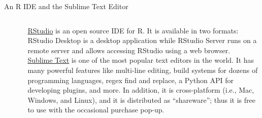 \documentclass[pdf]{beamer}
\theoremstyle{remark}
\theoremstyle{definition}
\begin{document}
\begin{frame}[t]{An R IDE and the Sublime Text Editor}
\begin{columns}[T]
\begin{column}{0.2\textwidth}
\begin{figure}[htbp]
  \captionsetup{justification=centering}
  \includegraphics[height=1.2cm, trim=0.1cm 0.1cm 0.1cm 0.1cm width=1.2cm]{Images/R.jpg}
\end{figure}
\vspace{8.0ex}
\begin{figure}[htbp]
  \captionsetup{justification=centering}
  \includegraphics[height=1.2cm, trim=0.1cm 0.1cm 0.1cm 0.1cm width=1.2cm]{Images/Sublime_Text.jpg}
\end{figure}
\end{column}
\begin{column}{0.7\textwidth}  %
\href{https://posit.co/download/rstudio-desktop/}{RStudio} is an open source IDE for R. It is available in two formats: RStudio Desktop is a desktop application while RStudio Server runs on a remote server and allows accessing RStudio using a web browser. \\
\vspace{1.5ex}
\href{https://www.sublimetext.com/}{Sublime Text} is one of the most popular text editors in the world. It has many powerful features like multi-line editing, build systems for dozens of programming languages, regex find and replace, a Python API for developing plugins, and more.  In addition, it is cross-platform (i.e., Mac, Windows, and Linux), and it is distributed as ``shareware''; thus it is free to use with the occasional purchase pop-up.
\end{column}
\end{columns}
\end{frame}
\end{document}
